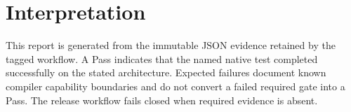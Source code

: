 \documentclass[10pt,letterpaper]{article}
\begin{document}
\section*{Interpretation}
This report is generated from the immutable JSON evidence retained by the
tagged workflow. A Pass indicates that the named native test completed
successfully on the stated architecture. Expected failures document known
compiler capability boundaries and do not convert a failed required gate into
a Pass. The release workflow fails closed when required evidence is absent.
\end{document}

